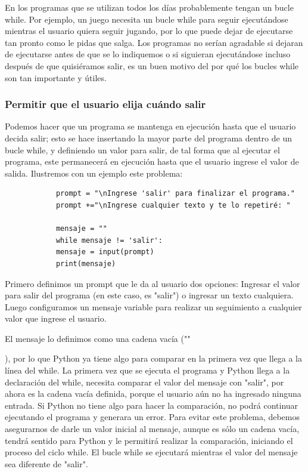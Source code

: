 {		En los programas que se  utilizan todos los días probablemente tengan un bucle {\ttfamily while}. Por ejemplo, un juego necesita un bucle {\ttfamily while} para seguir ejecutándose mientras el usuario quiera seguir jugando, por lo que puede dejar de ejecutarse tan pronto como le pidas que salga. Los programas no serían agradable  si dejaran de ejecutarse antes de que se lo indiquemos o si siguieran ejecutándose incluso después de que quisiéramos salir,  es un buen motivo del por qué los bucles {\ttfamily while} son tan importante y útiles.
		
		\subsubsection{Permitir que el usuario elija cuándo salir}
		
		Podemos hacer que un programa se mantenga en ejecución  hasta que el usuario decida salir; esto se hace insertando la mayor parte del programa dentro de un bucle {\ttfamily while},  y definiendo  un valor para salir, de tal forma que al ejecutar el programa, este permanecerá en ejecución hasta que el usuario ingrese  el valor de salida. Ilustremos con un ejemplo este problema: 
		
		\hspace{-2.2cm}{\ttfamily \scriptsize activo.py} \vspace{-0.55cm}
		\begin{lstlisting}		
			prompt = "\nIngrese 'salir' para finalizar el programa."
			prompt +="\nIngrese cualquier texto y te lo repetiré: "
			
			mensaje = ""
			while mensaje != 'salir':
			mensaje = input(prompt)
			print(mensaje)
		\end{lstlisting}	
		
		Primero definimos un {\ttfamily prompt} que le da al usuario dos opciones: Ingresar el valor para salir del programa (en este caso, es "salir") o ingresar un texto cualquiera. Luego configuramos un mensaje variable para realizar un seguimiento a cualquier valor que ingrese el usuario. 
		
		El mensaje lo definimos como una cadena vacía (\ttfamily {}"{}"{}}), por lo que Python ya tiene algo para comparar en la primera vez que llega a la línea del {\ttfamily while}.  La primera vez que se ejecuta el programa y Python llega a la declaración del {\ttfamily while},  necesita comparar el valor del mensaje con "salir",  { }por ahora es la cadena vacía definida, porque el usuario  aún no ha ingresado ninguna entrada.  Si Python no tiene algo para hacer la comparación, no podrá continuar ejecutando el programa y generara un error. Para evitar este problema, debemos asegurarnos de darle un valor inicial al mensaje, aunque es sólo un cadena vacía, tendrá sentido para Python y le permitirá realizar la comparación, iniciando el proceso del ciclo {\ttfamily while}. El bucle {\ttfamily while} se ejecutará mientras el valor del mensaje sea diferente de {\ttfamily "{}salir{}"{}}.
	
